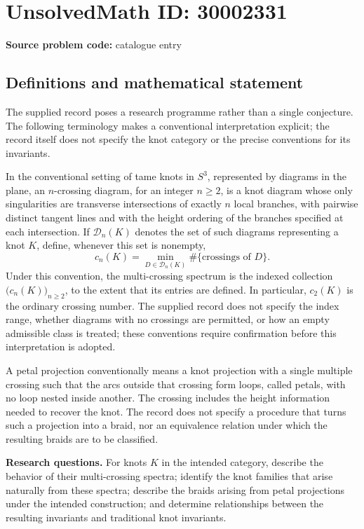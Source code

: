 \documentclass[11pt]{article}
\begin{document}
\section*{UnsolvedMath ID: 30002331}
\textbf{Source problem code:} catalogue entry
\subsection{Definitions and mathematical statement}
The supplied record poses a research programme rather than a single conjecture. The following terminology makes a conventional interpretation explicit; the record itself does not specify the knot category or the precise conventions for its invariants.

In the conventional setting of tame knots in \(S^3\), represented by diagrams in the plane, an \(n\)-crossing diagram, for an integer \(n\geq 2\), is a knot diagram whose only singularities are transverse intersections of exactly \(n\) local branches, with pairwise distinct tangent lines and with the height ordering of the branches specified at each intersection. If \(\mathcal D_n(K)\) denotes the set of such diagrams representing a knot \(K\), define, whenever this set is nonempty,
\[
 c_n(K)=\min_{D\in\mathcal D_n(K)}\#\{\text{crossings of }D\}.
\]
Under this convention, the multi-crossing spectrum is the indexed collection \(\bigl(c_n(K)\bigr)_{n\geq 2}\), to the extent that its entries are defined. In particular, \(c_2(K)\) is the ordinary crossing number. The supplied record does not specify the index range, whether diagrams with no crossings are permitted, or how an empty admissible class is treated; these conventions require confirmation before this interpretation is adopted.

A petal projection conventionally means a knot projection with a single multiple crossing such that the arcs outside that crossing form loops, called petals, with no loop nested inside another. The crossing includes the height information needed to recover the knot. The record does not specify a procedure that turns such a projection into a braid, nor an equivalence relation under which the resulting braids are to be classified.

\textbf{Research questions.} For knots \(K\) in the intended category, describe the behavior of their multi-crossing spectra; identify the knot families that arise naturally from these spectra; describe the braids arising from petal projections under the intended construction; and determine relationships between the resulting invariants and traditional knot invariants.
\end{document}
